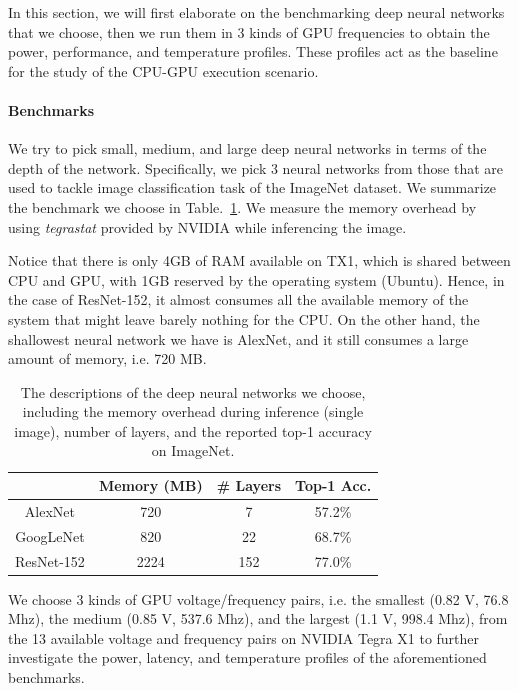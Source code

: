 In this section, we will first elaborate on the benchmarking deep neural networks that we choose, then we run them in 3 kinds of GPU frequencies to obtain the power, performance, and temperature profiles. These profiles act as the baseline for the study of the CPU-GPU execution scenario.

\paragraph{Benchmarks}

We try to pick small, medium, and large deep neural networks in terms of the depth of the network. Specifically, we pick 3 neural networks from those that are used to tackle image classification task of the ImageNet dataset. We summarize the benchmark we choose in Table.~\ref{table:1}. We measure the memory overhead by using \textit{tegrastat} provided by NVIDIA while inferencing the image.

Notice that there is only 4GB of RAM available on TX1, which is shared between CPU and GPU, with 1GB reserved by the operating system (Ubuntu). Hence, in the case of ResNet-152, it almost consumes all the available memory of the system that might leave barely nothing for the CPU. On the other hand, the shallowest neural network we have is AlexNet, and it still consumes a large amount of memory, i.e. 720 MB.


\begin{table}[h]
    \begin{center}
        \begin{tabular}{ | c | c | c | c | }
        \hline
        & Memory (MB) & \# Layers & Top-1 Acc. \\ \hline
        AlexNet{\cite{krizhevsky2012imagenet}} & 720 & 7 & 57.2\% \\ \hline
        GoogLeNet{\cite{szegedy2015going}} & 820 & 22 & 68.7\%  \\ \hline
        ResNet-152{\cite{he2016deep}} & 2224 & 152 & 77.0\% \\
        \hline
        \end{tabular}
    \end{center}
    \caption{The descriptions of the deep neural networks we choose, including the memory overhead during inference (single image), number of layers, and the reported top-1 accuracy on ImageNet.}\label{table:1}
\end{table}

We choose 3 kinds of GPU voltage/frequency pairs, i.e. the smallest (0.82 V, 76.8 Mhz), the medium (0.85 V, 537.6 Mhz), and the largest (1.1 V, 998.4 Mhz), from the 13 available voltage and frequency pairs on NVIDIA Tegra X1 to further investigate the power, latency, and temperature profiles of the aforementioned benchmarks.


